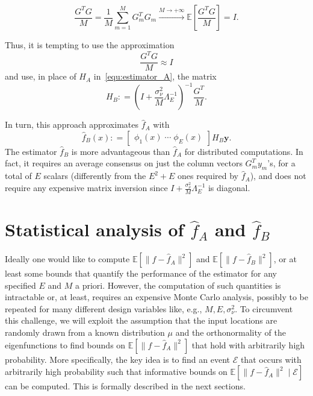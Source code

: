 \documentclass[10pt,twocolumn,twoside]{IEEEtran}					%
\theoremstyle	{plain}
\newcommand{\DefinedAs}			[0]	{\mathrel{\mathop:}=}
\newcommand{\Expectation}					[0]	{\mathbb{E}}
\newcommand{\ExpectationOf}					[1]	{\Expectation \left[ #1 \right]}
\newcommand{\ExpectationOfGiven}			[2]	{\ExpectationOf{ #1 \; \left| \; #2 \right. }}
\begin{document}
\begin{equation}
	\frac{G^{T} G}{M}
	=
	\frac{1}{M} \sum_{m = 1}^{M} G_{m}^{T} G_{m}
	\xrightarrow{M \rightarrow +\infty}
	\ExpectationOf{ \frac{G^{T} G}{M} }
	=
	I.
	\label{equ:expected_G_T_G_over_M_equals_I}
\end{equation}

Thus, it is tempting to use the approximation
%
\begin{equation}
	\frac{G^{T} G}{M} 
	\approx 
	I
	\label{equ:expected_G_T_G_over_M_equals_I_2}
\end{equation}
%
and use, in place of $H_{A}$ in~\eqref{equ:estimator_A}, the matrix 
%
\begin{equation}
	H_{B}
	\DefinedAs
	\left( I + \frac{\sigma^{2}_{\nu}}{M} \Lambda^{-1}_{E} \right)^{-1} \frac{G^{T}}{M}.
	\label{equ:definition_of_H_B}
\end{equation}

In turn, this approach approximates $\widehat{f}_{A}$ with
%
\begin{equation}	
	\widehat{f}_{B}(x)
	\DefinedAs
	\begin{bmatrix}
		\phi_{1}(x) \; \cdots \; \phi_{E}(x)
	\end{bmatrix}
	H_{B}
	\bm{y} .	
	\label{equ:estimator_B}
\end{equation}
%
The estimator $\widehat{f}_{B}$ is more advantageous than $\widehat{f}_{A}$ for distributed computations. In fact, it requires an average consensus on just the column vectors $G_{m}^{T} y_{m}$'s, for a total of $E$ scalars (differently from the $E^{2} + E$ ones required by $\widehat{f}_{A}$), and does not require any expensive matrix inversion since $I + \frac{\sigma^{2}_{\nu}}{M} \Lambda^{-1}_{E}$ is diagonal.

\section{Statistical analysis of $\widehat{f}_{A}$ and $\widehat{f}_{B}$}
\label{sec:statistical_characterizations_of_widehat_f_a_and_widehat_f_b}

Ideally one would like to compute $\ExpectationOf{\| f - \widehat{f}_{A} \|^2}$ and $\ExpectationOf{\| f - \widehat{f}_{B} \|^2}$, or at least some bounds that quantify the performance of the estimator for any specified $E$ and $M$ a priori. However, the computation of such quantities is intractable or, at least, requires an expensive Monte Carlo analysis, possibly to be repeated for many different design variables like, e.g., $M,E,\sigma^{2}_{\nu}$. To circumvent this challenge, we will exploit the assumption that the input locations are randomly drawn from a known distribution $\mu$ and the orthonormality of the eigenfunctions to find bounds on $\ExpectationOf{\| f - \widehat{f}_{A} \|^2}$ that hold with arbitrarily high probability. More specifically, the key idea is to find an event $\mathcal{E}$ that occurs with arbitrarily high probability such that informative bounds on $\ExpectationOfGiven{\| f - \widehat{f}_{A} \|^2}{\mathcal{E}}$ can be computed. This is formally described in the next sections.
\end{document}
